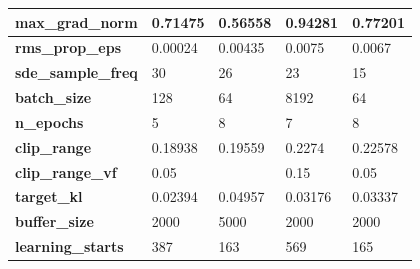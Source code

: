 \documentclass[../xlapes02]{subfiles}
\begin{document}
\begin{table}[!ht]
\begin{tabular}{|l||l|l||l|l|}
            \textbf{max\_grad\_norm}           & 0.71475                                      & 0.56558                                      & 0.94281                                      & 0.77201                                      \\ \hline
            \textbf{rms\_prop\_eps}            & 0.00024                                      & 0.00435                                      & 0.0075                                       & 0.0067                                       \\ \hline
            \textbf{sde\_sample\_freq}         & 30                                           & 26                                           & 23                                           & 15                                           \\ \hline
            \textbf{batch\_size}               & 128                                          & 64                                           & 8192                                         & 64                                           \\ \hline
            \textbf{n\_epochs}                 & 5                                            & 8                                            & 7                                            & 8                                            \\ \hline
            \textbf{clip\_range}               & 0.18938                                      & 0.19559                                      & 0.2274                                       & 0.22578                                      \\ \hline
            \textbf{clip\_range\_vf}           & 0.05                                         & ~                                            & 0.15                                         & 0.05                                         \\ \hline
            \textbf{target\_kl}                & 0.02394                                      & 0.04957                                      & 0.03176                                      & 0.03337                                      \\ \hline
            \textbf{buffer\_size}              & 2000                                         & 5000                                         & 2000                                         & 2000                                         \\ \hline
            \textbf{learning\_starts}          & 387                                          & 163                                          & 569                                          & 165                                          \\ \hline

\end{tabular}
\end{table}
\end{document}
